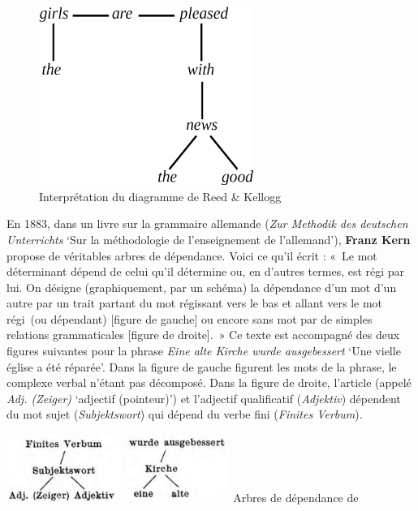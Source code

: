 {    \begin{figure}
    \caption{Interprétation du diagramme de Reed \& Kellogg}
    \includegraphics[width=7cm]{figures/ReedKellogTree}    
    \end{figure}

    En 1883, dans un livre sur la grammaire allemande (\textit{Zur Methodik des deutschen Unterrichts} ‘Sur la méthodologie de l’enseignement de l’allemand’), \textbf{Franz Kern} propose de véritables arbres de dépendance. Voici ce qu’il écrit : «~Le mot déterminant dépend de celui qu’il détermine ou, en d’autres termes, est régi par lui. On désigne (graphiquement, par un schéma) la dépendance d’un mot d’un autre par un trait partant du mot régissant vers le bas et allant vers le mot régi~(ou dépendant) [figure de gauche] ou encore sans mot par de simples relations grammaticales [figure de droite].~» Ce texte est accompagné des deux figures suivantes pour la phrase \textit{Eine alte Kirche wurde ausgebessert} ‘Une vielle église a été réparée’. Dans la figure de gauche figurent les mots de la phrase, le complexe verbal n’étant pas décomposé. Dans la figure de droite, l’article (appelé \textit{Adj. (Zeiger)} ‘adjectif (pointeur)’) et l’adjectif qualificatif (\textit{Adjektiv}) dépendent du mot sujet (\textit{Subjektswort}) qui dépend du verbe fini (\textit{Finites Verbum}).

    \ea
    \includegraphics[width=.45\textwidth]{figures/vol1syntaxe2-img014.png}
    \includegraphics[width=.45\textwidth]{figures/vol1syntaxe2-img015.png}
    Arbres de dépendance de \citet{Kern1883}

}
